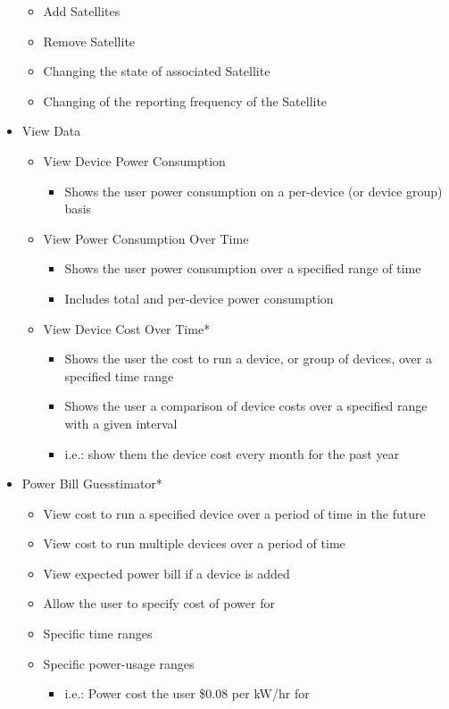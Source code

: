 \begin{itemize}
\begin{itemize}
	 \item Add Satellites
	 \item Remove Satellite
	 \item Changing the state of associated Satellite
	 \item Changing of the reporting frequency of the Satellite
	\end{itemize}
 \item View Data
	\begin{itemize}
	 \item View Device Power Consumption
		\begin{itemize}
		 \item Shows the user power consumption on a per-device (or device group) basis
		\end{itemize}
	 \item View Power Consumption Over Time
		\begin{itemize}
		 \item Shows the user power consumption over a specified range of time
		 \item Includes total and per-device power consumption
		\end{itemize}
	 \item View Device Cost Over Time*
		\begin{itemize}
		 \item Shows the user the cost to run a device, or group of devices, over a specified time range
		 \item Shows the user a comparison of device costs over a specified range with a given interval
		 \item i.e.:  show them the device cost every month for the past year
		\end{itemize}
	\end{itemize}
 \item Power Bill Guesstimator*
	\begin{itemize}
	 \item View cost to run a specified device over a period of time in the future
	 \item View cost to run multiple devices over a period of time
	 \item View expected power bill if a device is added
	 \item Allow the user to specify cost of power for
	 \item Specific time ranges
	 \item Specific power-usage ranges
		\begin{itemize}
		 \item i.e.: Power cost the user \$0.08 per kW/hr for 

\end{itemize}
\end{itemize}
\end{itemize}
